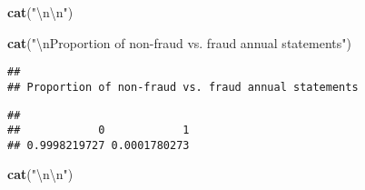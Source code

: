 \documentclass[
]{article}
\newenvironment{Shaded}{\begin{snugshade}}{\end{snugshade}}
\newcommand{\CharTok}[1]{\textcolor[rgb]{0.31,0.60,0.02}{#1}}
\newcommand{\CommentTok}[1]{\textcolor[rgb]{0.56,0.35,0.01}{\textit{#1}}}
\newcommand{\KeywordTok}[1]{\textcolor[rgb]{0.13,0.29,0.53}{\textbf{#1}}}
\newcommand{\NormalTok}[1]{#1}
\newcommand{\OperatorTok}[1]{\textcolor[rgb]{0.81,0.36,0.00}{\textbf{#1}}}
\newcommand{\StringTok}[1]{\textcolor[rgb]{0.31,0.60,0.02}{#1}}
\begin{document}
\begin{Shaded}
\begin{Highlighting}[]
        \KeywordTok{cat}\NormalTok{(}\StringTok{"}\CharTok{\textbackslash{}n\textbackslash{}n}\StringTok{"}\NormalTok{)}
\end{Highlighting}
\end{Shaded}

\begin{Shaded}
\begin{Highlighting}[]
        \KeywordTok{cat}\NormalTok{(}\StringTok{"}\CharTok{\textbackslash{}n}\StringTok{Proportion of non-fraud vs. fraud annual statements"}\NormalTok{)}
\end{Highlighting}
\end{Shaded}

\begin{verbatim}
## 
## Proportion of non-fraud vs. fraud annual statements
\end{verbatim}

\begin{Shaded}
\end{Shaded}

\begin{verbatim}
## 
##            0            1 
## 0.9998219727 0.0001780273
\end{verbatim}

\begin{Shaded}
\begin{Highlighting}[]
        \KeywordTok{cat}\NormalTok{(}\StringTok{"}\CharTok{\textbackslash{}n\textbackslash{}n}\StringTok{"}\NormalTok{)}
\end{Highlighting}
\end{Shaded}

\begin{Shaded}
\end{Shaded}
\end{document}
